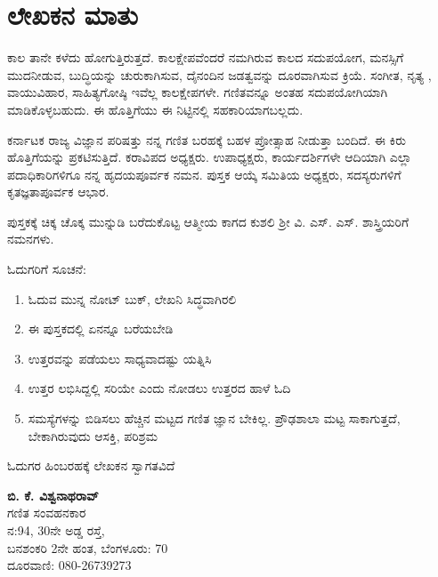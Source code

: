 {
\makeatletter
\def\@makechapterhead#1{%
  \vspace*{5\p@}%
  {\parindent \z@ \raggedright \normalfont
    \ifnum \c@secnumdepth >\m@ne
      \if@mainmatter
        \LARGE\bfseries \@chapapp\space\thechapter
        \vskip 4pt
        \par\nobreak
        \vskip 5\p@
      \fi
    \fi
    \interlinepenalty\@M
    \LARGE\bfseries #1\par\nobreak
    \vskip 15\p@
  }}
  \makeatother



\chapter{ಲೇಖಕನ ಮಾತು}





ಕಾಲ ತಾನೇ ಕಳೆದು ಹೋಗುತ್ತಿರುತ್ತದೆ. ಕಾಲಕ್ಷೇಪವೆಂದರೆ ನಮಗಿರುವ ಕಾಲದ ಸದುಪಯೋಗ, ಮನಸ್ಸಿಗೆ ಮುದನೀಡುವ, ಬುದ್ಧಿಯನ್ನು ಚುರುಕಾಗಿಸುವ, ದೈನಂದಿನ ಜಡತ್ವವನ್ನು ದೂರವಾಗಿಸುವ ಕ್ರಿಯೆ. ಸಂಗೀತ, ನೃತ್ಯ , ವಾಯುವಿಹಾರ, ಸಾಹಿತ್ಯಗೋಷ್ಠಿ ಇವೆಲ್ಲ ಕಾಲಕ್ಷೇಪಗಳೇ. ಗಣಿತವನ್ನೂ ಅಂತಹ ಸದುಪಯೋಗಿಯಾಗಿ ಮಾಡಿಕೊಳ್ಳಬಹುದು. ಈ ಹೊತ್ತಿಗೆಯು ಈ ನಿಟ್ಟಿನಲ್ಲಿ ಸಹಕಾರಿಯಾಗಬಲ್ಲದು. 

ಕರ್ನಾಟಕ ರಾಜ್ಯ ವಿಜ್ಞಾನ ಪರಿಷತ್ತು ನನ್ನ ಗಣಿತ ಬರಹಕ್ಕೆ ಬಹಳ ಪ್ರೋತ್ಸಾಹ ನೀಡುತ್ತಾ ಬಂದಿದೆ. ಈ ಕಿರು ಹೊತ್ತಿಗೆಯನ್ನು ಪ್ರಕಟಿಸುತ್ತಿದೆ. ಕರಾವಿಪದ ಅಧ್ಯಕ್ಷರು. ಉಪಾಧ್ಯಕ್ಷರು, ಕಾರ್ಯದರ್ಶಿಗಳೇ ಆದಿಯಾಗಿ ಎಲ್ಲಾ ಪದಾಧಿಕಾರಿಗಳಿಗೂ ನನ್ನ ಹೃದಯಪೂರ್ವಕ ನಮನ. ಪುಸ್ತಕ ಆಯ್ಕೆ ಸಮಿತಿಯ ಅಧ್ಯಕ್ಷರು, ಸದಸ್ಯರುಗಳಿಗೆ ಕೃತಜ್ಞತಾಪೂರ್ವಕ ಆಭಾರ. 

ಪುಸ್ತಕಕ್ಕೆ  ಚಿಕ್ಕ ಚೊಕ್ಕ ಮುನ್ನುಡಿ ಬರೆದುಕೊಟ್ಟ ಆತ್ಮೀಯ ಕಾಗದ ಕುಶಲಿ ಶ್ರೀ ವಿ. ಎಸ್. ಎಸ್.  ಶಾಸ್ತ್ರಿಯರಿಗೆ ನಮನಗಳು.

ಓದುಗರಿಗೆ ಸೂಚನೆ: 
\begin{enumerate}
\item ಓದುವ ಮುನ್ನ ನೋಟ್ ಬುಕ್, ಲೇಖನಿ ಸಿದ್ಧವಾಗಿರಲಿ 
\item ಈ ಪುಸ್ತಕದಲ್ಲಿ ಏನನ್ನೂ ಬರೆಯಬೇಡಿ 
\item ಉತ್ತರವನ್ನು ಪಡೆಯಲು ಸಾಧ್ಯವಾದಷ್ಟು ಯತ್ನಿಸಿ
\item ಉತ್ತರ ಲಭಿಸಿದ್ದಲ್ಲಿ ಸರಿಯೇ ಎಂದು ನೋಡಲು ಉತ್ತರದ ಹಾಳೆ ಓದಿ 
\item ಸಮಸ್ಯೆಗಳನ್ನು ಬಿಡಿಸಲು ಹೆಚ್ಚಿನ ಮಟ್ಟದ ಗಣಿತ ಜ್ಞಾನ ಬೇಕಿಲ್ಲ. ಪ್ರೌಢಶಾಲಾ ಮಟ್ಟ ಸಾಕಾಗುತ್ತದೆ, ಬೇಕಾಗಿರುವುದು ಆಸಕ್ತಿ, ಪರಿಶ್ರಮ 
\end{enumerate}
ಓದುಗರ ಹಿಂಬರಹಕ್ಕೆ ಲೇಖಕನ ಸ್ವಾಗತವಿದೆ 

\begin{flushright}
{\bf ಬಿ. ಕೆ. ವಿಶ್ವನಾಥರಾವ್}\\
ಗಣಿತ ಸಂವಹನಕಾರ\\
ನ:{\rm 94}, {\rm 30}ನೇ ಅಡ್ಡ ರಸ್ತೆ, \\
ಬನಶಂಕರಿ {\rm 2}ನೇ ಹಂತ, ಬೆಂಗಳೂರು: {\rm 70}\\
ದೂರವಾಣಿ: {\rm 080-26739273}
\end{flushright}


}



